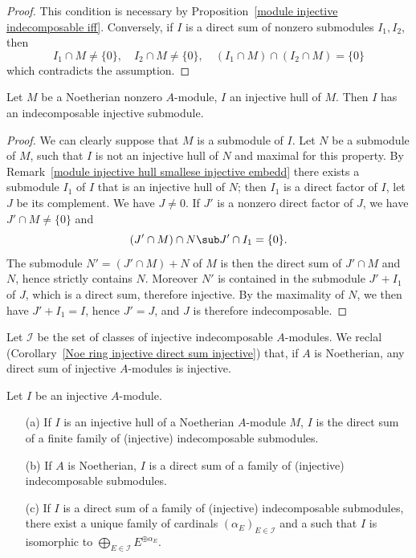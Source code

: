 \begin{proof}
This condition is necessary by Proposition~\ref{module injective indecomposable iff}. Conversely, if $I$ is a direct sum of nonzero submodules $I_1,I_2$, then
\[I_1\cap M\neq\{0\},\quad I_2\cap M\neq\{0\},\quad (I_1\cap M)\cap(I_2\cap M)=\{0\}\]
which contradicts the assumption.
\end{proof}
\begin{lemma}\label{Noe module injective hull has indecomposable}
Let $M$ be a Noetherian nonzero $A$-module, $I$ an injective hull of $M$. Then $I$ has an indecomposable injective submodule.
\end{lemma}
\begin{proof}
We can clearly suppose that $M$ is a submodule of $I$. Let $N$ be a submodule of $M$, such that $I$ is not an injective hull of $N$ and maximal for this property. By Remark~\ref{module injective hull smallese injective embedd} there exists a submodule $I_1$ of $I$ that is an injective hull of $N$; then $I_1$ is a direct factor of $I$, let $J$ be its complement. We have $J\neq 0$. If $J'$ is a nonzero direct factor of $J$, we have $J'\cap M\neq\{0\}$ and
\[(J'\cap M)\cap N\sub J'\cap I_1=\{0\}.\]
The submodule $N'=(J'\cap M)+N$ of $M$ is then the direct sum of $J'\cap M$ and $N$, hence strictly contains $N$. Moreover $N'$ is contained in the submodule $J'+I_1$ of $J$, which is a direct sum, therefore injective. By the maximality of $N$, we then have $J'+I_1=I$, hence $J'=J$, and $J$ is therefore indecomposable.
\end{proof}
Let $\mathscr{I}$ be the set of classes of injective indecomposable $A$-modules. We reclal (Corollary~\ref{Noe ring injective direct sum injective}) that, if $A$ is Noetherian, any direct sum of injective $A$-modules is injective.
\begin{theorem}\label{module injective direct sum of indecomposable}
Let $I$ be an injective $A$-module.
\begin{itemize}
\item[(a)] If $I$ is an injective hull of a Noetherian $A$-module $M$, $I$ is the direct sum of a finite family of (injective) indecomposable  submodules.
\item[(b)] If $A$ is Noetherian, $I$ is a direct sum of a family of (injective) indecomposable submodules.
\item[(c)] If $I$ is a direct sum of a family of (injective) indecomposable submodules, there exist a unique family of cardinals $(\alpha_E)_{E\in\mathscr{I}}$ and a such that $I$ is isomorphic to $\bigoplus_{E\in\mathscr{I}}E^{\oplus\alpha_E}$.
\end{itemize}
\end{theorem}
